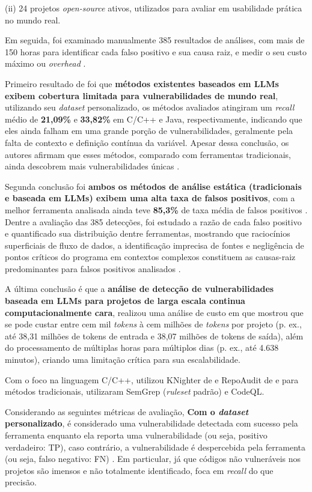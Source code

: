 \documentclass[
    12pt,                %
    openright,           %
    oneside,             %
    a4paper,             %
    english,             %
    brazil               %
]{abntex2}
\begin{document}
(ii) 24 projetos \textit{open-source} ativos, utilizados para avaliar em usabilidade prática no mundo real.
\par
Em seguida, foi examinado manualmente 385 resultados de análises, com mais de 150 horas para identificar cada falso positivo e sua causa raiz, e medir o seu custo máximo ou \textit{overhead} \cite{li2026llmbased}.
\par
Primeiro resultado de  foi que \textbf{métodos existentes baseados em LLMs exibem cobertura limitada para vulnerabilidades de mundo real}, utilizando seu \textit{dataset} personalizado, os métodos avaliados atingiram um \textit{recall} médio de \textbf{21,09\%} e \textbf{33,82\%} em C/C++ e Java, respectivamente, indicando que eles ainda falham em uma grande porção de vulnerabilidades, geralmente pela falta de contexto e definição contínua da variável.
Apesar dessa conclusão, os autores afirmam que esses métodos, comparado com ferramentas tradicionais, ainda descobrem mais vulnerabilidades únicas \cite{li2026llmbased}.
\par
Segunda conclusão foi \textbf{ambos os métodos de análise estática (tradicionais e baseada em LLMs) exibem uma alta taxa de falsos positivos}, com a melhor ferramenta analisada ainda teve \textbf{85,3\%} de taxa média de falsos positivos \cite{li2026llmbased}.
Dentre a avaliação das 385 detecções, foi estudado a razão de cada falso positivo e quantificado sua distribuição dentre ferramentas, mostrando que raciocínios superficiais de fluxo de dados, a identificação imprecisa de fontes e negligência de pontos críticos do programa em contextos complexos constituem as causas-raiz predominantes para falsos positivos analisados \cite{li2026llmbased}.
\par
A última conclusão é que a \textbf{análise de detecção de vulnerabilidades baseada em LLMs para projetos de larga escala continua computacionalmente cara},  realizou uma análise de custo em que mostrou que se pode custar entre cem mil \textit{tokens} à cem milhões de \textit{tokens} por projeto (p. ex., até 38,31 milhões de tokens de entrada e 38,07 milhões de tokens de saída), além do processamento de múltiplas horas para múltiplos dias (p. ex., até 4.638 minutos), criando uma limitação crítica para sua escalabilidade.
\par
Com o foco na linguagem C/C++,  utilizou KNighter de  e RepoAudit de  e para métodos tradicionais, utilizaram SemGrep (\textit{ruleset} padrão) e CodeQL.
\par
Considerando as seguintes métricas de avaliação, \textbf{Com o \textit{dataset} personalizado}, é considerado uma vulnerabilidade detectada com sucesso pela ferramenta enquanto ela reporta uma vulnerabilidade (ou seja, positivo verdadeiro: TP), caso contrário, a vulnerabilidade é despercebida pela ferramenta (ou seja, falso negativo: FN) \cite{li2026llmbased}.
Em particular, já que códigos não vulneráveis nos projetos são imensos e não totalmente identificado,  foca em \textit{recall} do que precisão.
\end{document}
